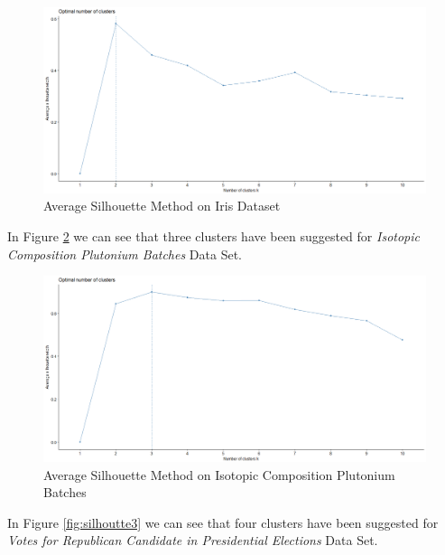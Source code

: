 \begin{itemize}
\begin{figure}[h!]
  \centering
  \includegraphics[scale=1.2]{figures/results/iris/silhouette.png}
  \caption{Average Silhouette Method on Iris Dataset}
  \label{fig:silhoutte1}
\end{figure}

\vspace{15mm}

In Figure \ref{fig:silhoutte2} we can see that three clusters have been suggested for \textit{Isotopic Composition Plutonium Batches} Data Set.

\begin{figure}[h!]
  \centering
  \includegraphics[scale=1.3]{figures/results/pluton/silhouette.png}
  \caption{Average Silhouette Method on Isotopic Composition Plutonium Batches}
  \label{fig:silhoutte2}
\end{figure}

\newpage

In Figure \ref{fig:silhoutte3} we can see that four clusters have been suggested for \textit{Votes for Republican Candidate in Presidential Elections} Data Set.


\end{itemize}
